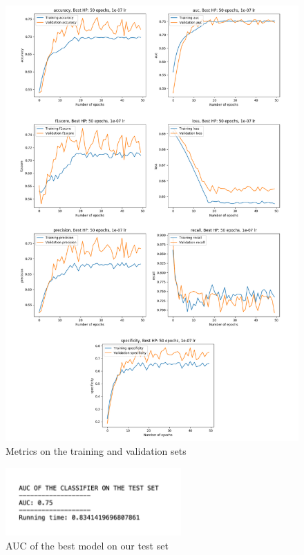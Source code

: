 \newpage

\begin{figure}[!h]
\centering
\includegraphics[width=1\textwidth, keepaspectratio=true]{./figures/paper_reproduction_results.png}
\caption{Metrics on the training and validation sets}
\label{fig:paper_reproduction_results}
\end{figure}



\begin{figure}[!t]
\centering
\includegraphics[width=0.6\textwidth, keepaspectratio=true]{./figures/auc_our_test_set.png}
\caption{AUC of the best model on our test set}
\label{fig:paper_reproduction_auc_on_our_test_set}
\end{figure}

